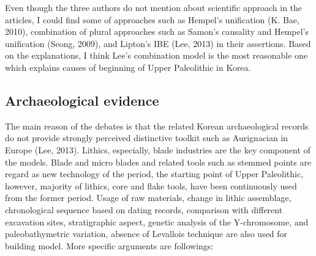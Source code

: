 \documentclass[american,man]{apa6}
\begin{document}
Even though the three authors do not mention about scientific approach
in the articles, I could find some of approaches such as Hempel's
unification (K. Bae, 2010), combination of plural approaches such as
Samon's causality and Hempel's unification (Seong, 2009), and Lipton's
IBE (Lee, 2013) in their assertions. Based on the explanations, I think
Lee's combination model is the most reasonable one which explains causes
of beginning of Upper Paleolithic in Korea.

\subsection{Archaeological evidence}\label{archaeological-evidence}

The main reason of the debates is that the related Korean archaeological
records do not provide strongly perceived distinctive toolkit such as
Aurignacian in Europe (Lee, 2013). Lithics, especially, blade industries
are the key component of the models. Blade and micro blades and related
tools such as stemmed points are regard as new technology of the period,
the starting point of Upper Paleolithic, however, majority of lithics,
core and flake tools, have been continuously used from the former
period. Usage of raw materials, change in lithic assemblage,
chronological sequence based on dating records, comparison with
different excavation sites, stratigraphic aspect, genetic analysis of
the Y-chromosome, and paleobathymetric variation, absence of Levallois
technique are also used for building model. More specific arguments are
followings:
\end{document}
